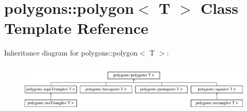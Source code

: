 \hypertarget{classpolygons_1_1polygon}{\section{polygons\-:\-:polygon$<$ T $>$ Class Template Reference}
\label{classpolygons_1_1polygon}
}
Inheritance diagram for polygons\-:\-:polygon$<$ T $>$\-:\begin{figure}[H]
\begin{center}
\leavevmode
\includegraphics[height=2.372881cm]{classpolygons_1_1polygon}
\end{center}
\end{figure}
